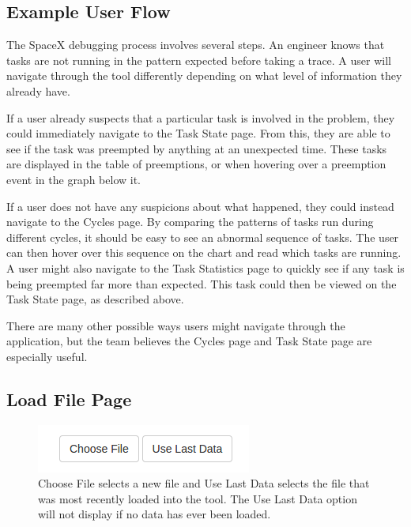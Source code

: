 \documentclass{hmcclinic}
\begin{document}
\subsection{Example User Flow}
  The SpaceX debugging process involves several steps. 
  An engineer knows that tasks are not running in the
  pattern expected before taking a trace. A user will navigate through the tool
  differently depending on what level of information they already have.

  If a user already suspects that a particular task is involved
  in the problem, they could immediately navigate to the Task State page. From
  this, they are able to see if the task was preempted by anything
  at an unexpected time. These tasks are displayed in the table of
  preemptions, or when hovering over a preemption event in the graph below it.

  If a user does not have any suspicions about what happened, they could instead
  navigate to the Cycles page. By comparing the patterns of tasks run during
  different cycles, it should be easy to see an abnormal sequence of tasks. The
  user can then hover over this sequence on the chart and read which tasks are
  running. A user might also navigate to the Task Statistics page to quickly see
  if any task is being preempted far more than expected. This task could then be
  viewed on the Task State page, as described above.

  There are many other possible ways users might navigate through the
  application, but the team believes the Cycles page and Task State page 
are especially useful.


\subsection{Load File Page}

\begin{figure}[H]
  \centering
      \includegraphics[scale=0.75]{loadFile-buttons.png}
  \caption{Choose File selects a new file and Use Last Data selects the file
  that was most recently loaded into the tool. The Use Last Data option will not
display if no data has ever been loaded.}
  \end{figure}
\end{document}

